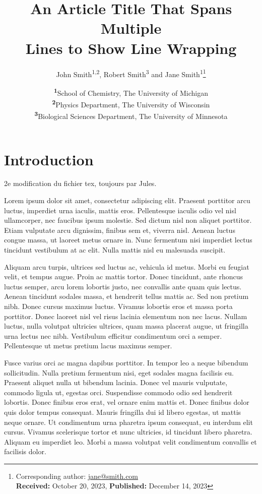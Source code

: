 \documentclass[
	a4paper, %
	10pt, %
	unnumberedsections, %
	twoside, %
]{LTJournalArticle}
\title{An Article Title That Spans Multiple\\ Lines to Show Line Wrapping} %
\author{%
	John Smith\textsuperscript{1,2}, Robert Smith\textsuperscript{3} and Jane Smith\textsuperscript{1}\thanks{Corresponding author: \href{mailto:jane@smith.com}{jane@smith.com}\\ \textbf{Received:} October 20, 2023, \textbf{Published:} December 14, 2023}
}
\date{\footnotesize\textsuperscript{\textbf{1}}School of Chemistry, The University of Michigan\\ \textsuperscript{\textbf{2}}Physics Department, The University of Wisconsin\\ \textsuperscript{\textbf{3}}Biological Sciences Department, The University of Minnesota}
\begin{document}
\maketitle %


\section{Introduction}

2e modification du fichier tex, toujours par Jules.

Lorem ipsum dolor sit amet, consectetur adipiscing elit. Praesent porttitor arcu luctus, imperdiet urna iaculis, mattis eros. Pellentesque iaculis odio vel nisl ullamcorper, nec faucibus ipsum molestie. Sed dictum nisl non aliquet porttitor. Etiam vulputate arcu dignissim, finibus sem et, viverra nisl. Aenean luctus congue massa, ut laoreet metus ornare in. Nunc fermentum nisi imperdiet lectus tincidunt vestibulum at ac elit. Nulla mattis nisl eu malesuada suscipit.

Aliquam arcu turpis, ultrices sed luctus ac, vehicula id metus. Morbi eu feugiat velit, et tempus augue. Proin ac mattis tortor. Donec tincidunt, ante rhoncus luctus semper, arcu lorem lobortis justo, nec convallis ante quam quis lectus. Aenean tincidunt sodales massa, et hendrerit tellus mattis ac. Sed non pretium nibh. Donec cursus maximus luctus. Vivamus lobortis eros et massa porta porttitor. Donec laoreet nisl vel risus lacinia elementum non nec lacus. Nullam luctus, nulla volutpat ultricies ultrices, quam massa placerat augue, ut fringilla urna lectus nec nibh. Vestibulum efficitur condimentum orci a semper. Pellentesque ut metus pretium lacus maximus semper.

Fusce varius orci ac magna dapibus porttitor. In tempor leo a neque bibendum sollicitudin. Nulla pretium fermentum nisi, eget sodales magna facilisis eu. Praesent aliquet nulla ut bibendum lacinia. Donec vel mauris vulputate, commodo ligula ut, egestas orci. Suspendisse commodo odio sed hendrerit lobortis. Donec finibus eros erat, vel ornare enim mattis et. Donec finibus dolor quis dolor tempus consequat. Mauris fringilla dui id libero egestas, ut mattis neque ornare. Ut condimentum urna pharetra ipsum consequat, eu interdum elit cursus. Vivamus scelerisque tortor et nunc ultricies, id tincidunt libero pharetra. Aliquam eu imperdiet leo. Morbi a massa volutpat velit condimentum convallis et facilisis dolor.
\end{document}

